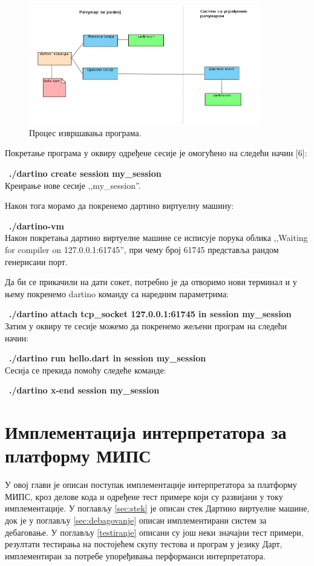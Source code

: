 \documentclass[12pt,oneside]{memoir}
\begin{document}
\begin{figure}[!ht]
  \centering
  \includegraphics[width=0.9\textwidth]{sesije.png}
  \caption{Процес извршавања програма.}
  \label{fig:izvrsavanje}
\end{figure}

Покретање програма у оквиру одређене сесије је омогућено на следећи начин [6]:

~\textbf{./dartino create session my\_session}\\
Креирање нове сесије ,,my\_session''.

Након тога морамо да покренемо дартино виртуелну машину:

~\textbf{./dartino-vm}\\
Након покретања дартино виртуелне машине се исписује порука облика ,,Waiting for compiler on 127.0.0.1:61745'', при чему број 61745 представља рандом генерисани порт.

Да би се прикачили на дати сокет, потребно је да отворимо нови терминал и у њему покренемо dartino команду са наредним параметрима:

~\textbf{./dartino attach tcp\_socket 127.0.0.1:61745 in session my\_session}\\

Затим у оквиру те сесије можемо да покренемо жељени програм на следећи начин:

~\textbf{./dartino run hello.dart in session my\_session}\\

Сесија се прекида помоћу следеће команде:

~\textbf{./dartino x-end session my\_session}\\


\chapter{Имплементација интерпретатора за платформу МИПС}
\label{chp:implementacija}
У овој глави је описан поступак имплементације интерпретатора за платформу МИПС, кроз делове кода и одређене тест примере који су развијани у току имплементације. У поглављу \ref{sec:stek} је описан стек Дартино виртуелне машине, док је у поглављу \ref{sec:debagovanje} описан имплементирани систем за дебаговање. У поглављу \ref{testiranje} описани су још неки значајни тест примери, резултати тестирања на постојећем скупу тестова и програм у језику Дарт, имплементиран за потребе упоређивања перформанси интерпретатора.
\end{document}
